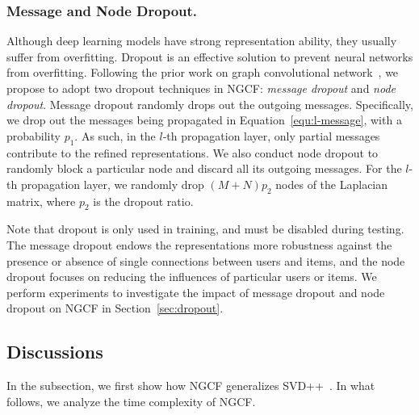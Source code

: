 \documentclass[sigconf]{acmart}
\theoremstyle{definition}
\begin{document}
\subsubsection{\textbf{Message and Node Dropout.}}
Although deep learning models have strong representation ability, they usually suffer from overfitting.
Dropout is an effective solution to prevent neural networks from overfitting.
Following the prior work on graph convolutional network~\cite{GC-MC}, we propose to adopt two dropout techniques in NGCF: \emph{message dropout} and \emph{node dropout}.
Message dropout randomly drops out the outgoing messages.
Specifically, we drop out the messages being propagated in Equation~\eqref{equ:l-message}, with a probability $p_{1}$.
As such, in the $l$-th propagation layer, only partial messages contribute to the refined representations.
We also conduct node dropout to randomly block a particular node and discard all its outgoing messages.
For the $l$-th propagation layer, we randomly drop $(M+N)p_{2}$ nodes of the Laplacian matrix, where $p_{2}$ is the dropout ratio.

Note that dropout is only used in training, and must be disabled during testing. 
The message dropout endows the representations more robustness against the presence or absence of single connections between users and items, and the node dropout focuses on reducing the influences of particular users or items. 
We perform experiments to investigate the impact of message dropout and node dropout on NGCF in Section~\ref{sec:dropout}.

\subsection{Discussions}\label{ss:discussions}
In the subsection, we first show how NGCF generalizes SVD++~\cite{SVDFeatures}.
In what follows, we analyze the time complexity of NGCF.
\end{document}
